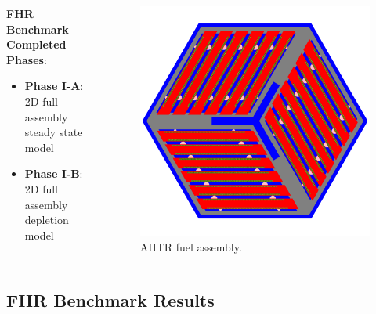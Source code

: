 \begin{frame}
\begin{columns}[t]
\begin{column}{0.5\textwidth}
        \vspace{0.1cm}
        \textbf{FHR Benchmark Completed Phases}: 
        \begin{itemize}
            \item \textbf{Phase I-A}: 2D full assembly steady state model 
            \item \textbf{Phase I-B}: 2D full assembly depletion model 
        \end{itemize}
    \end{column}
    \begin{column}{0.5\textwidth}
        \begin{figure}[]
            \includegraphics[width=\linewidth]{../docs/figures/ahtr-fuel-element.png} 
            \vspace{-0.7cm}
            \caption{AHTR fuel assembly.}
        \end{figure}
    \end{column}
\end{columns}
\end{frame}

\subsection{FHR Benchmark Results}

